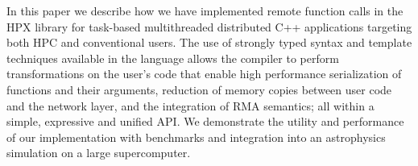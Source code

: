 In this paper we describe how we have implemented remote function calls in the
HPX library for task-based multithreaded distributed C++ applications targeting
both HPC and conventional users.
The use of strongly typed syntax and template techniques available in the language 
allows the compiler to perform transformations on the user's code that enable 
high performance serialization of functions and their arguments, 
reduction of memory copies between user code and the network layer, 
and the integration of RMA semantics; all within a simple, expressive and unified API.
We demonstrate the utility and performance of our implementation with benchmarks
and integration into an astrophysics simulation on a large supercomputer.

